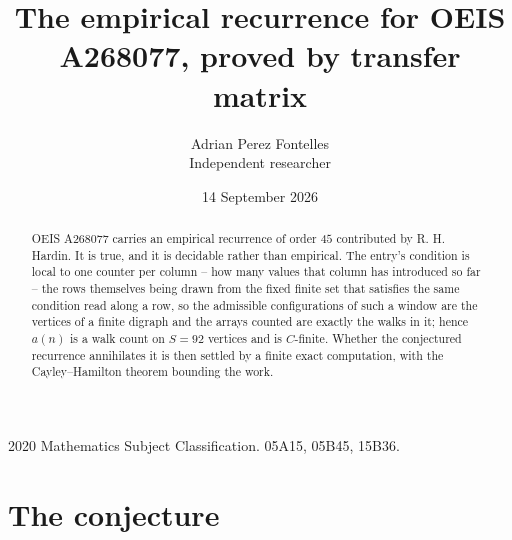 \documentclass[11pt,a4paper]{article}
\title{The empirical recurrence for OEIS A268077, proved by transfer matrix}
\author{Adrian Perez Fontelles\\ \small Independent researcher}
\date{14 September 2026}
\theoremstyle{plain}
\theoremstyle{definition}
\begin{document}
\maketitle

\begin{abstract}
OEIS A268077 carries an empirical recurrence of order $45$ contributed by R. H. Hardin. It is
true, and it is decidable rather than empirical. The entry's condition is local to one counter per column -- how many values that column has introduced so far -- the rows themselves being drawn from the fixed finite set that satisfies the same condition read along a row, so
the admissible configurations of such a window are the vertices of a finite digraph and the
arrays counted are exactly the walks in it; hence $a(n)$ is a walk count on $S=92$ vertices
and is $C$-finite. Whether the conjectured recurrence annihilates it is then settled by a
finite exact computation, with the Cayley--Hamilton theorem bounding the work.
\end{abstract}

\noindent\small 2020 Mathematics Subject Classification. 05A15, 05B45, 15B36.\normalsize

\section{The conjecture}
\end{document}
